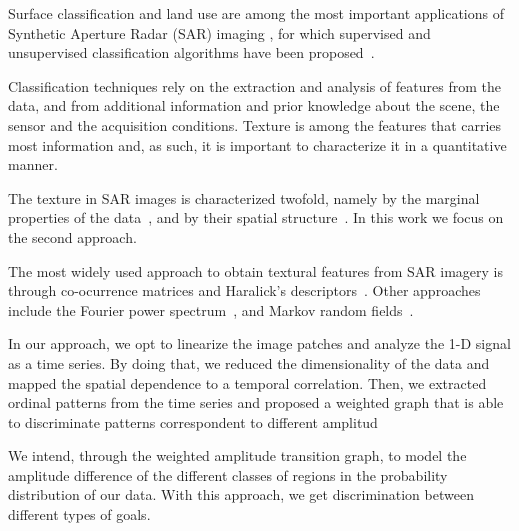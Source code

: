 \documentclass{isprs}
\begin{document}
	Surface classification and land use are among the most important applications of Synthetic Aperture Radar (SAR) imaging \cite{Pottier2004Unsupervised}, for which supervised and unsupervised classification algorithms have been proposed~\cite{Bhattacharya2018Unsupervised,Chen1996multifrequency,ZYL1992Bayesian}.
	
	Classification techniques rely on the extraction and analysis of features from the data, and from additional information and prior knowledge about  the scene, the sensor and the acquisition conditions.
	Texture is among the features that carries most information and, as such, it is important to characterize it in a quantitative manner.
	
	The texture in SAR images is characterized twofold, namely by the marginal properties of the data~\cite{adrian96}, and by their spatial structure~\cite{FeaturesCropDiscrimination}.
	In this work we focus on the second approach.
	
	The most widely used approach to obtain textural features from SAR imagery is through co-ocurrence matrices and Haralick's descriptors~\cite{Zakeri2017Texture}.
	Other approaches include the Fourier power spectrum~\cite{Florindo2012Fractal}, and
	Markov random fields~\cite{Deng2005UnsupervisedSO}.
	
	In our approach, we opt to linearize the image patches and analyze the 1-D signal as a time series. By doing that, we reduced the dimensionality of the data and mapped the spatial dependence to a temporal correlation. Then, we extracted ordinal patterns from the time series and proposed a weighted graph that is able to discriminate patterns correspondent to different amplitud
	
	
	We intend, through the weighted amplitude transition graph, to model the amplitude difference of the different classes of regions in the probability distribution of our data.
	With this approach, we get discrimination between different types of goals.
	
\end{document}
